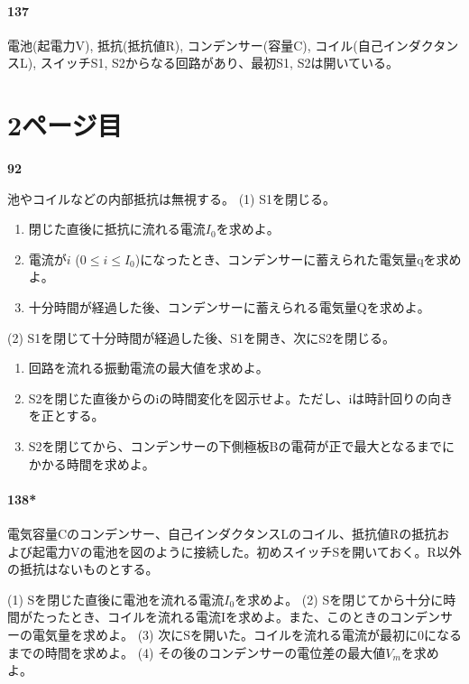 \documentclass[a4paper, 10pt, dvipdfmx]{bxjsarticle}
\begin{document}
\paragraph{137} 電池(起電力V), 抵抗(抵抗値R), コンデンサー(容量C), コイル(自己インダクタンスL), スイッチS1, S2からなる回路があり、最初S1, S2は開いている。
\begin{center}
\end{center}

\clearpage

\section*{2ページ目}
\noindent
\textbf{92}

池やコイルなどの内部抵抗は無視する。
(1) S1を閉じる。
\begin{enumerate}[label=(\alph*)]
    \item 閉じた直後に抵抗に流れる電流$I_0$を求めよ。
    \item 電流が$i$ ($0 \le i \le I_0$)になったとき、コンデンサーに蓄えられた電気量qを求めよ。
    \item 十分時間が経過した後、コンデンサーに蓄えられる電気量Qを求めよ。
\end{enumerate}
(2) S1を閉じて十分時間が経過した後、S1を開き、次にS2を閉じる。
\begin{enumerate}[label=(\alph*)]
    \item 回路を流れる振動電流の最大値を求めよ。
    \item S2を閉じた直後からのiの時間変化を図示せよ。ただし、iは時計回りの向きを正とする。
    \item S2を閉じてから、コンデンサーの下側極板Bの電荷が正で最大となるまでにかかる時間を求めよ。
\end{enumerate}

\paragraph{138*} 電気容量Cのコンデンサー、自己インダクタンスLのコイル、抵抗値Rの抵抗および起電力Vの電池を図のように接続した。初めスイッチSを開いておく。R以外の抵抗はないものとする。
\begin{center}
\end{center}
(1) Sを閉じた直後に電池を流れる電流$I_0$を求めよ。
(2) Sを閉じてから十分に時間がたったとき、コイルを流れる電流Iを求めよ。また、このときのコンデンサーの電気量を求めよ。
(3) 次にSを開いた。コイルを流れる電流が最初に0になるまでの時間を求めよ。
(4) その後のコンデンサーの電位差の最大値$V_m$を求めよ。
\end{document}

